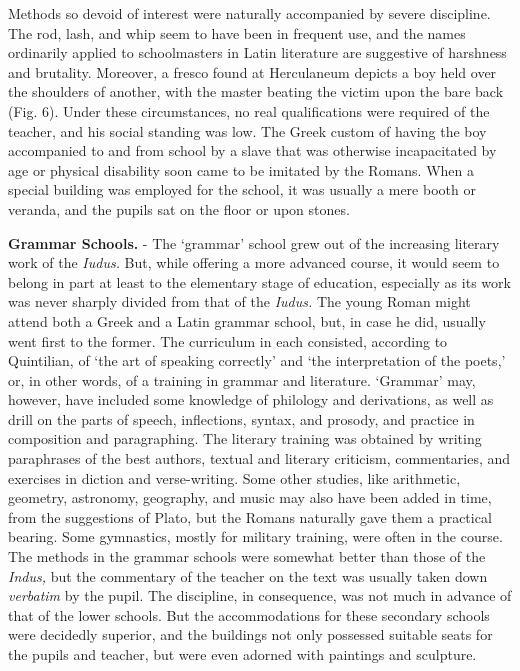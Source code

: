 \documentclass[
]{book}
\begin{document}
Methods so devoid of interest were naturally accompanied by severe discipline. The rod, lash, and whip seem to have been in frequent use, and the names ordinarily applied to schoolmasters in Latin literature are suggestive of harshness and brutality. Moreover, a fresco found at Herculaneum depicts a boy held over the shoulders of another, with the master beating the victim upon the bare back (Fig. 6). Under these circumstances, no real qualifications were required of the teacher, and his social standing was low. The Greek custom of having the boy accompanied to and from school by a slave that was otherwise incapacitated by age or physical disability soon came to be imitated by the Romans. When a special building was employed for the school, it was usually a mere booth or veranda, and the pupils sat on the floor or upon stones.

\textbf{Grammar Schools.} - The `grammar' school grew out of the increasing literary work of the \emph{Iudus.} But, while offering a more advanced course, it would seem to belong in part at least to the elementary stage of education, especially as its work was never sharply divided from that of the \emph{Iudus.} The young Roman might attend both a Greek and a Latin grammar school, but, in case he did, usually went first to the former. The curriculum in each consisted, according to Quintilian, of `the art of speaking correctly' and `the interpretation of the poets,' or, in other words, of a training in grammar and literature. `Grammar' may, however, have included some knowledge of philology and derivations, as well as drill on the parts of speech, inflections, syntax, and prosody, and practice in composition and paragraphing. The literary training was obtained by writing paraphrases of the best authors, textual and literary criticism, commentaries, and exercises in diction and verse-writing. Some other studies, like arithmetic, geometry, astronomy, geography, and music may also have been added in time, from the suggestions of Plato, but the Romans naturally gave them a practical bearing. Some gymnastics, mostly for military training, were often in the course. The methods in the grammar schools were somewhat better than those of the \emph{Indus,} but the commentary of the teacher on the text was usually taken down \emph{verbatim} by the pupil. The discipline, in consequence, was not much in advance of that of the lower schools. But the accommodations for these secondary schools were decidedly superior, and the buildings not only possessed suitable seats for the pupils and teacher, but were even adorned with paintings and sculpture.
\end{document}
